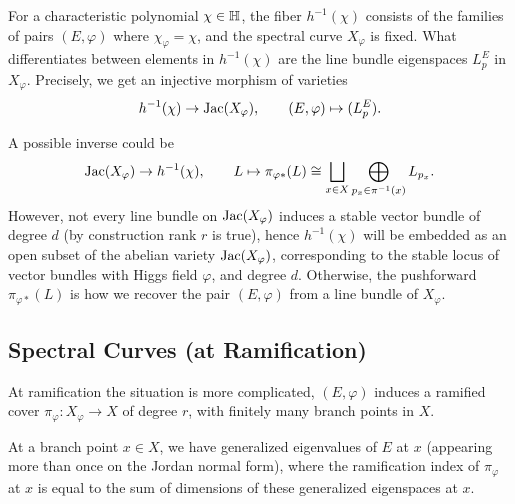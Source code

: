 For a characteristic polynomial $\chi\in\mathbb{H}$, the fiber $h^{-1}(\chi)$ consists of the families of pairs $(E,\varphi)$ where $\chi_\varphi=\chi$, and the spectral curve $X_\varphi$ is fixed. What differentiates between elements in $h^{-1}(\chi)$ are the line bundle eigenspaces $L^E_p$ in $X_\varphi$. Precisely, we get an injective morphism of varieties
\begin{equation}
    h^{-1}(\chi)\rightarrow\text{Jac}(X_\varphi),\qquad (E,\varphi)\mapsto (L^E_p).
\end{equation}

A possible inverse could be
\begin{equation}
    \text{Jac}(X_\varphi)\rightarrow h^{-1}(\chi),\qquad L\mapsto\pi_{\varphi*}(L)\cong\bigsqcup_{x\in X}\bigoplus_{p_x\in\pi^{-1}(x)}L_{p_x}.
\end{equation}
However, not every line bundle on $\text{Jac}(X_\varphi)$ induces a stable vector bundle of degree $d$ (by construction rank $r$ is true), hence $h^{-1}(\chi)$ will be embedded as an open subset of the abelian variety $\text{Jac}(X_\varphi)$, corresponding to the stable locus of vector bundles with Higgs field $\varphi$, and degree $d$. Otherwise, the pushforward $\pi_{\varphi*}(L)$ is how we recover the pair $(E,\varphi)$ from a line bundle of $X_\varphi$.

\subsection{Spectral Curves (at Ramification)}

At ramification the situation is more complicated, $(E,\varphi)$ induces a ramified cover $\pi_\varphi:X_\varphi\rightarrow X$ of degree $r$, with finitely many branch points in $X$.

At a branch point $x\in X$, we have generalized eigenvalues of $E$ at $x$ (appearing more than once on the Jordan normal form), where the ramification index of $\pi_\varphi$ at $x$ is equal to the sum of dimensions of these generalized eigenspaces at $x$.

